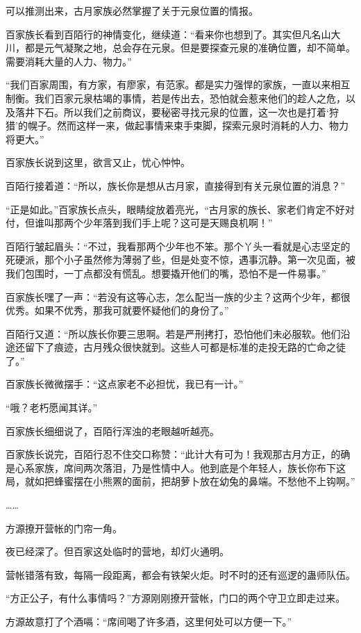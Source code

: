 \begin{this_body}
可以推测出来，古月家族必然掌握了关于元泉位置的情报。

百家族长看到百陌行的神情变化，继续道：“看来你也想到了。其实但凡名山大川，都是元气凝聚之地，总会存在元泉。但是要探查元泉的准确位置，却不简单。需要消耗大量的人力、物力。”

“我们百家周围，有方家，有廖家，有范家。都是实力强悍的家族，一直以来相互制衡。我们百家元泉枯竭的事情，若是传出去，恐怕就会惹来他们的趁人之危，以及落井下石。所以我们之前商议，要秘密寻找元泉的位置，这一次也是打着‘狩猎’的幌子。然而这样一来，做起事情来束手束脚，探索元泉时消耗的人力、物力将更大。”

百家族长说到这里，欲言又止，忧心忡忡。

百陌行接着道：“所以，族长你是想从古月家，直接得到有关元泉位置的消息？”

“正是如此。”百家族长点头，眼睛绽放着亮光，“古月家的族长、家老们肯定不好对付，但谁叫那两个少年落到我们手上呢？这可是天赐良机啊！”

百陌行皱起眉头：“不过，我看那两个少年也不笨。那个丫头一看就是心志坚定的死硬派，那个小子虽然修为薄弱了些，但是处变不惊，遇事沉静。第一次见面，被我们包围时，一丁点都没有慌乱。想要撬开他们的嘴，恐怕不是一件易事。”

百家族长嘿了一声：“若没有这等心志，怎么配当一族的少主？这两个少年，都很优秀。如果不优秀，那我可就要怀疑他们的身份了。”

百陌行又道：“所以族长你要三思啊。若是严刑拷打，恐怕他们未必服软。他们沿途还留下了痕迹，古月残众很快就到。这些人可都是标准的走投无路的亡命之徒了。”

百家族长微微摆手：“这点家老不必担忧，我已有一计。”

“哦？老朽愿闻其详。”

百家族长细细说了，百陌行浑浊的老眼越听越亮。

百家族长说完，百陌行忍不住交口称赞：“此计大有可为！我观那古月方正，的确是心系家族，席间两次落泪，乃是性情中人。他到底是个年轻人，族长你布下这局，就如把蜂蜜摆在小熊罴的面前，把胡萝卜放在幼兔的鼻端。不愁他不上钩啊。”

……

方源撩开营帐的门帘一角。

夜已经深了。但百家这处临时的营地，却灯火通明。

营帐错落有致，每隔一段距离，都会有铁架火炬。时不时的还有巡逻的蛊师队伍。

“方正公子，有什么事情吗？”方源刚刚撩开营帐，门口的两个守卫立即走过来。

方源故意打了个酒嗝：“席间喝了许多酒，这里何处可以方便一下。”


\end{this_body}
